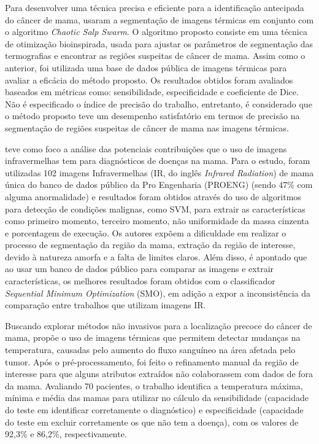 Para desenvolver uma técnica precisa e eficiente para a identificação antecipada do câncer de mama,  usaram a segmentação de imagens térmicas em conjunto com o algoritmo \textit{Chaotic Salp Swarm}. O algoritmo proposto consiste em uma técnica de otimização bioinspirada, usada para ajustar os parâmetros de segmentação das termografias e encontrar as regiões suspeitas de câncer de mama. Assim como o anterior, foi utilizada uma base de dados pública de imagens térmicas para avaliar a eficácia do método proposto. Os resultados obtidos foram avaliados baseados em métricas como: sensibilidade, especificidade e coeficiente de Dice. Não é especificado o índice de precisão do trabalho, entretanto, é considerado que o método proposto teve um desempenho satisfatório em termos de precisão na segmentação de regiões suspeitas de câncer de mama nas imagens térmicas.

 teve como foco a análise das potenciais contribuições que o uso de imagens infravermelhas tem para diagnósticos de doenças na mama. Para o estudo, foram utilizadas 102 imagens Infravermelhas (IR, do inglês \textit{Infrared Radiation}) de mama única do banco de dados público da Pro Engenharia (PROENG) (sendo 47\% com alguma anormalidade) e resultados foram obtidos através do uso de algoritmos para detecção de condições malignas, como SVM, para extrair as características como primeiro momento, terceiro momento, não uniformidade da massa cinzenta e porcentagem de execução. Os autores expõem a dificuldade em realizar o processo de segmentação da região da mama, extração da região de interesse, devido à natureza amorfa e a falta de limites claros. Além disso, é apontado que ao usar um banco de dados público para comparar as imagens e extrair características, os melhores resultados foram obtidos com o classificador \textit{Sequential Minimum Optimization} (SMO), em adição a expor a inconsistência da comparação entre trabalhos que utilizam imagens IR. 

Buscando explorar métodos não invasivos para a localização precoce do câncer de mama,  propõe o uso de imagens térmicas que permitem detectar mudanças na temperatura, causadas pelo aumento do fluxo sanguíneo na área afetada pelo tumor. Após o pré-processamento, foi feito o refinamento manual da região de interesse para que alguns atributos extraídos não colaborassem com dados de fora da mama. Avaliando 70 pacientes, o trabalho identifica a temperatura máxima, mínima e média das mamas para utilizar no cálculo da sensibilidade (capacidade do teste em identificar corretamente o diagnóstico) e especificidade (capacidade do teste em excluir corretamente os que não tem a doença), com os valores de 92,3\% e 86,2\%, respectivamente.

